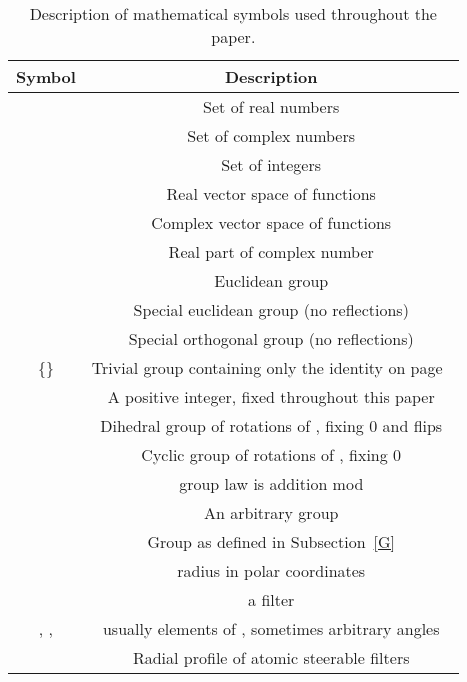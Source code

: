 \documentclass[journal]{IEEEtran}
\begin{document}
{		\begin{table}[h]
	\begin{center}
		\caption{Description of mathematical symbols used throughout the paper.}
		\label{dup1 table:comparative_rotmnist}
		\setlength{\tabcolsep}{3pt} \renewcommand{\arraystretch}{1.0} \begin{tabular}{c|c}
			 \textbf{Symbol} & \textbf{Description}   \\
			\midrule
             &  Set of real numbers \\
             &  Set of complex numbers \\
             &  Set of integers \\ 
             &  Real vector space of functions  \\
             &  Complex vector space of functions
             \\
             &  Real part of complex number \\
             &  Euclidean group \\
             &  Special euclidean group (no reflections) \\
             &  Special orthogonal group (no reflections) \\
            \{\} &   Trivial group containing only the identity on page~\pageref{Cn} \\
             & A positive integer, fixed throughout this paper\\
             & Dihedral group of  rotations of , fixing 0 and flips\\
             & Cyclic group of  rotations of , fixing 0\\
             &  group law is addition mod  \\
             &  An arbitrary group \\
             &  Group as defined in Subsection~\ref{G}  \\
             &  radius in polar coordinates \\
             &  a filter \\
            , ,  & usually elements of , sometimes arbitrary angles\\
             & Radial profile of atomic steerable filters \\
			\bottomrule
		\end{tabular}
	\end{center}
	\end{table}	
}


\end{document}
